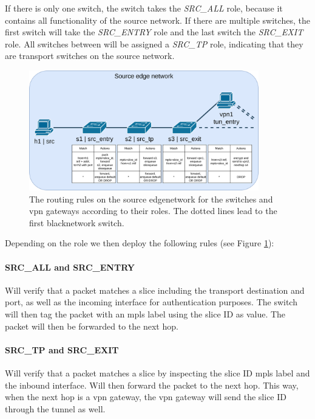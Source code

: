 If there is only one switch, the switch takes the \textit{SRC\_ALL} role, because it contains all functionality of the source network. If there are multiple switches, the first switch will take the \textit{SRC\_ENTRY} role and the last switch the \textit{SRC\_EXIT} role. All switches between will be assigned a \textit{SRC\_TP} role, indicating that they are transport switches on the source network.

\begin{figure}[ht]
    \centering
    \includegraphics[width=10cm]{images/chapter_6/routing_source.png}
    \caption[Routing on the source \gls{edgenetwork}]{The routing rules on the source \gls{edgenetwork} for the switches and \acrshort{vpn} gateways according to their roles. The dotted lines lead to the first \gls{blacknetwork} switch.}
    \label{fig:routing_source}
\end{figure}

Depending on the role we then deploy the following rules (see Figure \ref{fig:routing_source}):

\paragraph{SRC\_ALL and SRC\_ENTRY} Will verify that a packet matches a slice including the transport destination and port, as well as the incoming interface for authentication purposes. The switch will then tag the packet with an \acrshort{mpls} label using the slice ID as value. The packet will then be forwarded to the next hop.

\paragraph{SRC\_TP and SRC\_EXIT} Will verify that a packet matches a slice by inspecting the slice ID \acrshort{mpls} label and the inbound interface. Will then forward the packet to the next hop. This way, when the next hop is a \acrshort{vpn} gateway, the \acrshort{vpn} gateway will send the slice ID through the tunnel as well.

